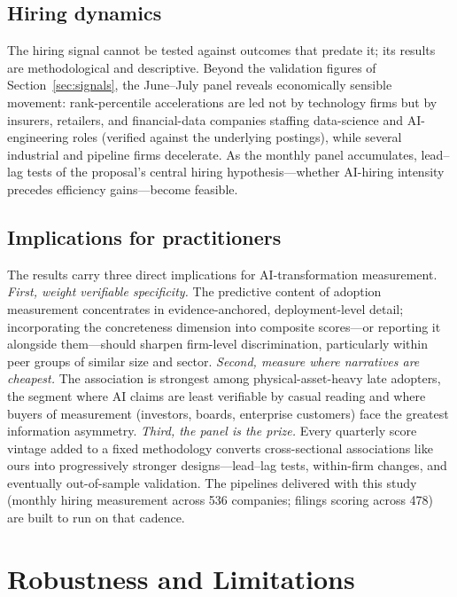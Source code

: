 \documentclass[11pt]{article}
\begin{document}
\subsection{Hiring dynamics}

The hiring signal cannot be tested against outcomes that predate it; its
results are methodological and descriptive. Beyond the validation figures of
Section~\ref{sec:signals}, the June--July panel reveals economically sensible
movement: rank-percentile accelerations are led not by technology firms but by
insurers, retailers, and financial-data companies staffing data-science and
AI-engineering roles (verified against the underlying postings), while several
industrial and pipeline firms decelerate. As the monthly panel accumulates,
lead--lag tests of the proposal's central hiring hypothesis---whether AI-hiring
intensity precedes efficiency gains---become feasible.

\subsection{Implications for practitioners}

The results carry three direct implications for AI-transformation measurement.
\emph{First, weight verifiable specificity.} The predictive content of
adoption measurement concentrates in evidence-anchored, deployment-level
detail; incorporating the concreteness dimension into composite scores---or
reporting it alongside them---should sharpen firm-level discrimination,
particularly within peer groups of similar size and sector.
\emph{Second, measure where narratives are cheapest.} The association is
strongest among physical-asset-heavy late adopters, the segment where AI
claims are least verifiable by casual reading and where buyers of measurement
(investors, boards, enterprise customers) face the greatest information
asymmetry. \emph{Third, the panel is the prize.} Every quarterly score vintage
added to a fixed methodology converts cross-sectional associations like ours
into progressively stronger designs---lead--lag tests, within-firm changes,
and eventually out-of-sample validation. The pipelines delivered with this
study (monthly hiring measurement across 536 companies; filings scoring across
478) are built to run on that cadence.

\section{Robustness and Limitations}
\label{sec:limitations}
\end{document}
